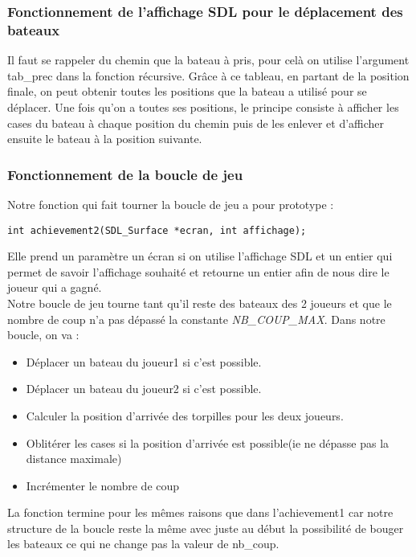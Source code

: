 \subsubsection{Fonctionnement de l'affichage SDL pour le déplacement des bateaux}
Il faut se rappeler du chemin que la bateau à pris, pour celà on utilise l'argument tab\_prec dans la fonction récursive. Grâce à ce tableau, en partant de la position finale, on peut obtenir toutes les positions que la bateau a utilisé pour se déplacer. Une fois qu'on a toutes ses positions, le principe consiste à afficher les cases du bateau à chaque position du chemin puis de les enlever et d'afficher ensuite le bateau à la position suivante. 
\subsubsection{Fonctionnement de la boucle de jeu}
Notre fonction qui fait tourner la boucle de jeu a pour prototype :
\begin{lstlisting}
int achievement2(SDL_Surface *ecran, int affichage);
\end{lstlisting}
Elle prend un paramètre un écran si on utilise l'affichage SDL et un entier qui permet de savoir l'affichage souhaité et retourne un entier afin de nous dire le joueur qui a gagné.\\
Notre boucle de jeu tourne tant qu'il reste des bateaux des 2 joueurs et que le nombre de coup n'a pas dépassé la constante {\textit{NB\_COUP\_MAX}}. Dans notre boucle, on va :
\begin{itemize}
\item Déplacer un bateau du joueur1 si c'est possible.
\item Déplacer un bateau du joueur2 si c'est possible.
\item Calculer la position d'arrivée des torpilles pour les deux joueurs.
\item Oblitérer les cases si la position d'arrivée est possible(ie ne dépasse pas la distance maximale)
\item Incrémenter le nombre de coup
\end{itemize}
La fonction termine pour les mêmes raisons que dans l'achievement1 car notre structure de la boucle reste la même avec juste au début la possibilité de bouger les bateaux ce qui ne change pas la valeur de nb\_coup.
